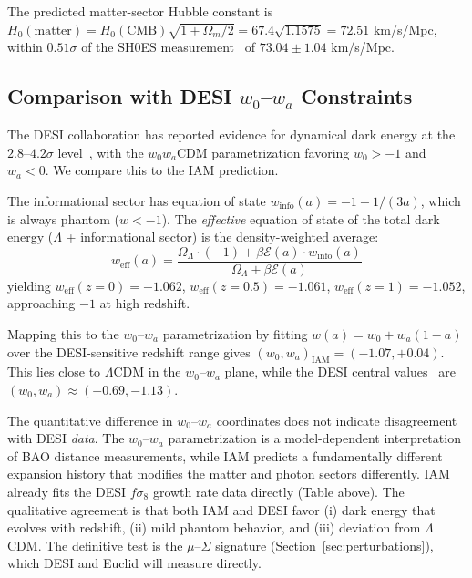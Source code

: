 \documentclass[aps,prd,twocolumn,superscriptaddress,nofootinbib]{revtex4-2}
\begin{document}
The predicted matter-sector Hubble constant is $H_0(\text{matter}) = H_0(\text{CMB})\sqrt{1 + \Omega_m/2} = 67.4\sqrt{1.1575} = 72.51$ km/s/Mpc, within $0.51\sigma$ of the SH0ES measurement~\cite{Riess2022} of $73.04 \pm 1.04$ km/s/Mpc.

\subsection{Comparison with DESI $w_0$--$w_a$ Constraints}

The DESI collaboration has reported evidence for dynamical dark energy at the $2.8$--$4.2\sigma$ level~\cite{DESI2025DR2}, with the $w_0w_a$CDM parametrization favoring $w_0 > -1$ and $w_a < 0$. We compare this to the IAM prediction.

The informational sector has equation of state $w_\text{info}(a) = -1 - 1/(3a)$, which is always phantom ($w < -1$). The \textit{effective} equation of state of the total dark energy ($\Lambda$ + informational sector) is the density-weighted average:
\begin{equation}
w_\text{eff}(a) = \frac{\Omega_\Lambda \cdot (-1) + \beta\mathcal{E}(a) \cdot w_\text{info}(a)}{\Omega_\Lambda + \beta\mathcal{E}(a)}
\end{equation}
yielding $w_\text{eff}(z=0) = -1.062$, $w_\text{eff}(z=0.5) = -1.061$, $w_\text{eff}(z=1) = -1.052$, approaching $-1$ at high redshift.

Mapping this to the $w_0$--$w_a$ parametrization by fitting $w(a) = w_0 + w_a(1-a)$ over the DESI-sensitive redshift range gives $(w_0, w_a)_\text{IAM} = (-1.07, +0.04)$. This lies close to $\Lambda$CDM in the $w_0$--$w_a$ plane, while the DESI central values~\cite{DESI2025DR2} are $(w_0, w_a) \approx (-0.69, -1.13)$.

The quantitative difference in $w_0$--$w_a$ coordinates does not indicate disagreement with DESI \textit{data}. The $w_0$--$w_a$ parametrization is a model-dependent interpretation of BAO distance measurements, while IAM predicts a fundamentally different expansion history that modifies the matter and photon sectors differently. IAM already fits the DESI $f\sigma_8$ growth rate data directly (Table above). The qualitative agreement is that both IAM and DESI favor (i) dark energy that evolves with redshift, (ii) mild phantom behavior, and (iii) deviation from $\Lambda$CDM. The definitive test is the $\mu$--$\Sigma$ signature (Section~\ref{sec:perturbations}), which DESI and Euclid will measure directly.
\end{document}
